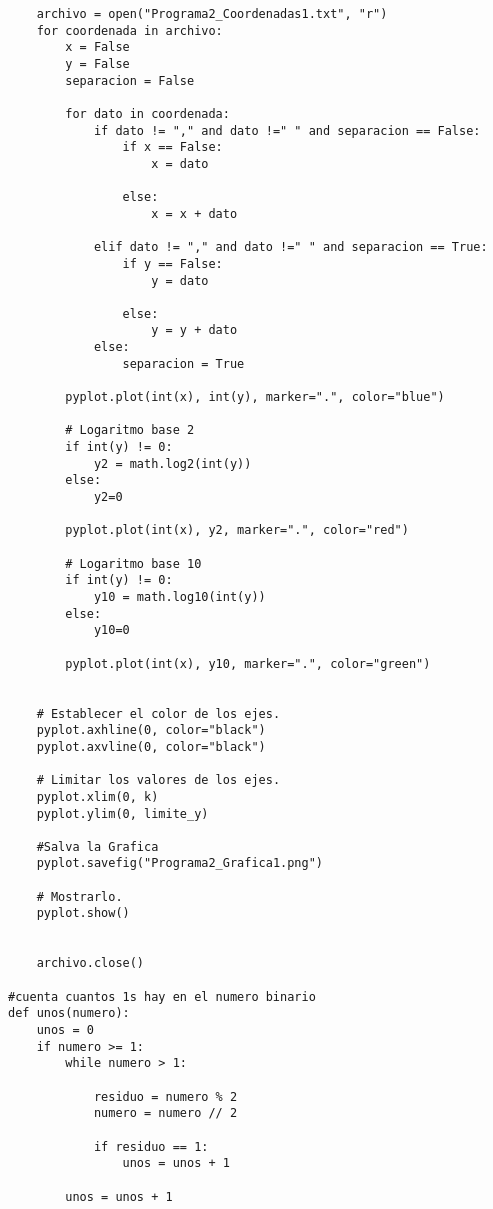 \documentclass{article}
\begin{document}
\begin{flushleft}
\begin{lstlisting}
    archivo = open("Programa2_Coordenadas1.txt", "r")
    for coordenada in archivo:
        x = False
        y = False
        separacion = False
        
        for dato in coordenada:
            if dato != "," and dato !=" " and separacion == False:
                if x == False:
                    x = dato
                
                else:
                    x = x + dato
            
            elif dato != "," and dato !=" " and separacion == True:
                if y == False:
                    y = dato
                
                else:
                    y = y + dato
            else:
                separacion = True
                
        pyplot.plot(int(x), int(y), marker=".", color="blue")
        
        # Logaritmo base 2
        if int(y) != 0:
            y2 = math.log2(int(y))
        else:
            y2=0
            
        pyplot.plot(int(x), y2, marker=".", color="red")

        # Logaritmo base 10
        if int(y) != 0:
            y10 = math.log10(int(y))
        else:
            y10=0
            
        pyplot.plot(int(x), y10, marker=".", color="green")
                
                
    # Establecer el color de los ejes.
    pyplot.axhline(0, color="black")
    pyplot.axvline(0, color="black")
    
    # Limitar los valores de los ejes.
    pyplot.xlim(0, k)
    pyplot.ylim(0, limite_y)
    
    #Salva la Grafica
    pyplot.savefig("Programa2_Grafica1.png")
    
    # Mostrarlo.
    pyplot.show()

            
    archivo.close()

#cuenta cuantos 1s hay en el numero binario
def unos(numero):
    unos = 0
    if numero >= 1:
        while numero > 1:
                
            residuo = numero % 2
            numero = numero // 2
                
            if residuo == 1:
                unos = unos + 1
        
        unos = unos + 1
                            

\end{lstlisting}
\end{flushleft}
\end{document}
